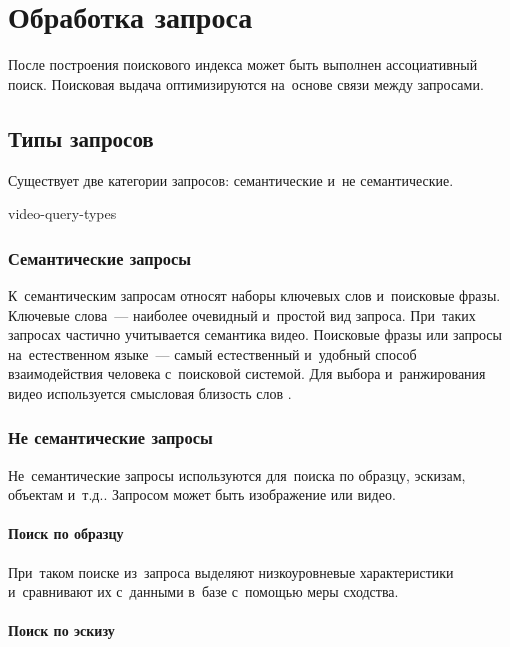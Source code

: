 \section{Обработка запроса}

После построения поискового индекса может быть выполнен ассоциативный поиск.
Поисковая выдача оптимизируются на~основе связи между запросами.

\subsection{Типы запросов}


Существует две категории запросов:
семантические и~не семантические.


\begin{figuredt}
    {video-query-types}
\end{figuredt}


\subsubsection{Семантические запросы}


К~семантическим запросам относят наборы ключевых слов
и~поисковые фразы.
Ключевые слова~— наиболее очевидный и~простой вид запроса.
При~таких запросах частично учитывается семантика видео.
Поисковые фразы или запросы на~естественном языке~—
самый естественный и~удобный способ взаимодействия
человека с~поисковой системой. Для выбора и~ранжирования видео
используется смысловая близость слов \cite{Aytar:2008}.

\subsubsection{Не семантические запросы}

Не~семантические запросы используются для~поиска по образцу,
эскизам, объектам и~т.д..
Запросом может быть изображение или видео.

\paragraph{Поиск по образцу}

При~таком поиске из~запроса выделяют низкоуровневые характеристики
и~сравнивают их с~данными в~базе с~помощью меры сходства.

\paragraph{Поиск по эскизу}

